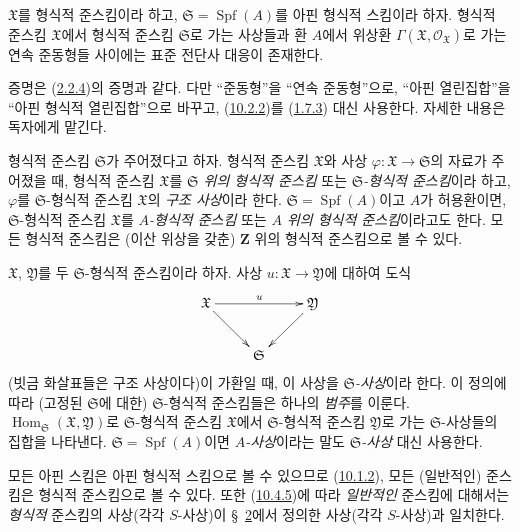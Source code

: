 \begin{proposition}[10.4.6]
\label{I.10.4.6-ko}
$\mathfrak{X}$를 형식적 준스킴이라 하고,
$\mathfrak{S}=\operatorname{Spf}(A)$를 아핀 형식적 스킴이라 하자.
형식적 준스킴 $\mathfrak{X}$에서 형식적 준스킴 $\mathfrak{S}$로 가는
사상들과 환 $A$에서 위상환
$\Gamma(\mathfrak{X},\mathscr{O}_{\mathfrak{X}})$로 가는 연속
준동형들 사이에는 표준 전단사 대응이 존재한다.
\end{proposition}

증명은 (\hyperref[I.2.2.4-ko]{2.2.4})의 증명과 같다. 다만
“준동형”을 “연속 준동형”으로, “아핀 열린집합”을 “아핀 형식적
열린집합”으로 바꾸고, (\hyperref[I.10.2.2-ko]{10.2.2})를
(\hyperref[I.1.7.3-ko]{1.7.3}) 대신 사용한다. 자세한 내용은 독자에게
맡긴다.

\begin{env}[10.4.7]
\label{I.10.4.7-ko}
형식적 준스킴 $\mathfrak{S}$가 주어졌다고 하자. 형식적 준스킴
$\mathfrak{X}$와 사상 $\varphi:\mathfrak{X}\to\mathfrak{S}$의 자료가
주어졌을 때, 형식적 준스킴 $\mathfrak{X}$를
\emph{$\mathfrak{S}$ 위의 형식적 준스킴} 또는
\emph{$\mathfrak{S}$-형식적 준스킴}이라 하고,
$\varphi$를 $\mathfrak{S}$-형식적 준스킴 $\mathfrak{X}$의
\emph{구조 사상}이라 한다. $\mathfrak{S}=\operatorname{Spf}(A)$이고
$A$가 허용환이면, $\mathfrak{S}$-형식적 준스킴 $\mathfrak{X}$를
\emph{$A$-형식적 준스킴} 또는 \emph{$A$ 위의 형식적 준스킴}이라고도
한다. 모든 형식적 준스킴은 (이산 위상을 갖춘) $\mathbf{Z}$ 위의
형식적 준스킴으로 볼 수 있다.

$\mathfrak{X}$, $\mathfrak{Y}$를 두 $\mathfrak{S}$-형식적 준스킴이라
하자. 사상 $u:\mathfrak{X}\to\mathfrak{Y}$에 대하여 도식
\[
  \xymatrix{
    \mathfrak{X}\ar[rr]^u\ar[rd] & &
    \mathfrak{Y}\ar[ld]\\
    & \mathfrak{S}
  }
\]
(빗금 화살표들은 구조 사상이다)이 가환일 때, 이 사상을
\emph{$\mathfrak{S}$-사상}이라 한다. 이 정의에 따라 (고정된
$\mathfrak{S}$에 대한) $\mathfrak{S}$-형식적 준스킴들은 하나의
\emph{범주}를 이룬다.
$\operatorname{Hom}_{\mathfrak{S}}(\mathfrak{X},\mathfrak{Y})$로
$\mathfrak{S}$-형식적 준스킴 $\mathfrak{X}$에서
$\mathfrak{S}$-형식적 준스킴 $\mathfrak{Y}$로 가는
$\mathfrak{S}$-사상들의 집합을 나타낸다.
$\mathfrak{S}=\operatorname{Spf}(A)$이면 \emph{$A$-사상}이라는 말도
\emph{$\mathfrak{S}$-사상} 대신 사용한다.
\end{env}

\begin{env}[10.4.8]
\label{I.10.4.8-ko}
모든 아핀 스킴은 아핀 형식적 스킴으로 볼 수 있으므로
(\hyperref[I.10.1.2-ko]{10.1.2}), 모든 (일반적인) 준스킴은 형식적
준스킴으로 볼 수 있다. 또한 (\hyperref[I.10.4.5-ko]{10.4.5})에 따라
\emph{일반적인} 준스킴에 대해서는 \emph{형식적} 준스킴의 사상(각각
$S$-사상)이 §~\hyperref[section:I.2-ko]{2}에서 정의한 사상(각각
$S$-사상)과 일치한다.
\end{env}

